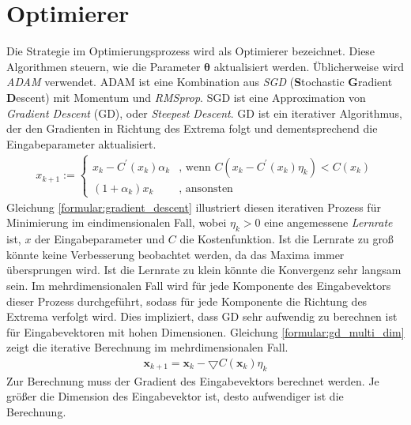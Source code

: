 \section{Optimierer}
Die Strategie im Optimierungsprozess wird als Optimierer bezeichnet.
Diese Algorithmen steuern, wie die Parameter $\boldsymbol\theta$ aktualisiert werden.
Üblicherweise wird \textit{ADAM} verwendet.
ADAM ist eine Kombination aus \textit{SGD} (\textbf{S}tochastic \textbf{G}radient \textbf{D}escent) mit Momentum und \textit{RMSprop}.
\newline
\newline
SGD ist eine Approximation von \textit{Gradient Descent} (GD), oder \textit{Steepest Descent}.
GD ist ein iterativer Algorithmus, der den Gradienten in Richtung des Extrema folgt und dementsprechend die Eingabeparameter aktualisiert.
\begin{align}
    \label{formular:gradient_descent}
    x_{k+1} := \begin{cases}
                   x_k - C^{\prime}(x_k)\alpha_k & \text{, wenn } C(x_k - C^{\prime}(x_k)\eta_k) < C(x_k)\\
                   (1 + \alpha_k)x_k & \text{, ansonsten}
    \end{cases}
\end{align}
Gleichung \ref{formular:gradient_descent} illustriert diesen iterativen Prozess für Minimierung im eindimensionalen Fall,
wobei $\eta_k > 0$ eine angemessene \textit{Lernrate} ist, $x$ der Eingabeparameter und $C$ die Kostenfunktion.
Ist die Lernrate zu groß könnte keine Verbesserung beobachtet werden, da das Maxima immer übersprungen wird.
Ist die Lernrate zu klein könnte die Konvergenz sehr langsam sein.
\newline
\newline
Im mehrdimensionalen Fall wird für jede Komponente des Eingabevektors dieser Prozess durchgeführt, sodass für jede Komponente
die Richtung des Extrema verfolgt wird.
Dies impliziert, dass GD sehr aufwendig zu berechnen ist für Eingabevektoren mit hohen Dimensionen.
Gleichung \ref{formular:gd_multi_dim} zeigt die iterative Berechnung im mehrdimensionalen Fall.
\begin{align}
    \label{formular:gd_multi_dim}
    \textbf{x}_{k+1} = \textbf{x}_k - \bigtriangledown C(\textbf{x}_k)\eta_k
\end{align}
Zur Berechnung muss der Gradient des Eingabevektors berechnet werden.
Je größer die Dimension des Eingabevektor ist, desto aufwendiger ist die Berechnung.
\newline
